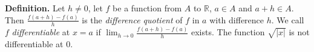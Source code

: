 {\bf Definition.} Let $h \not = 0$, let $f$ be a function from $A$ to
$\mathbb{R}$, $a \in A$ and $a+h \in A$.  Then $\frac{f(a+h) -
f(a)}{h}$ is the {\em difference quotient\/} of $f$ in $a$ with
difference $h$. We call $f$ {\em differentiable\/} at $x=a$ if
$\lim_{h \rightarrow 0}\frac{f(a+h) - f(a)}{h}$ exists.
The function $\sqrt{|x|}$ is not differentiable at 0. 
